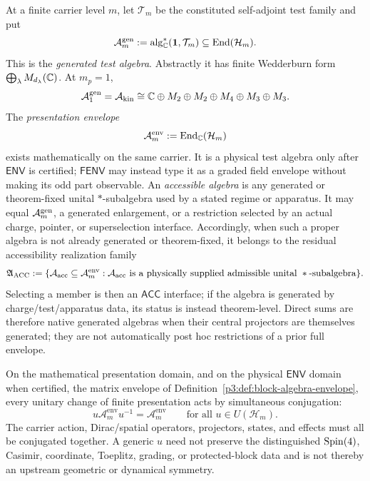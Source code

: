 \documentclass[12pt,a4paper]{article}
\begin{document}
\begin{definition}
\label{p4:def:resolved-vs-accessible-algebra}
At a finite carrier level \(m\), let \(\mathcal T_m\) be the constituted
self-adjoint test family and put
\[
 \mathcal A_m^{\rm gen}
 :=\operatorname{alg}_{\mathbb{C}}^{*}(\mathbf1,\mathcal T_m)
 \subseteq\operatorname{End}(\mathcal H_m).
\]
This is the \emph{generated test algebra}.  Abstractly it has finite
Wedderburn form \(\bigoplus_\lambda M_{d_\lambda}(\mathbb{C})\).  At \(m_p=1\),
\[
 \mathcal A_1^{\rm gen}=\mathcal A_{\rm kin}
 \cong\mathbb{C}\oplus M_2\oplus M_2\oplus M_4\oplus M_3\oplus M_3.
\]
The \emph{presentation envelope}
\[
 \mathcal A_m^{\rm env}:=\operatorname{End}_{\mathbb{C}}(\mathcal H_m)
\]
exists mathematically on the same carrier.  It is a physical test algebra only
after \(\mathsf{ENV}\) is certified; \(\mathsf{FENV}\) may instead type it as
a graded field envelope without making its odd part observable.  An
\emph{accessible algebra} is any
generated or theorem-fixed unital \(*\)-subalgebra used by a stated regime or
apparatus.  It may equal \(\mathcal A_m^{\rm gen}\), a generated enlargement,
or a restriction selected by an actual charge, pointer, or superselection
interface.  Accordingly, when such a proper algebra is not already generated
or theorem-fixed, it belongs to the residual accessibility realization family
\[
 \mathfrak A_{\rm ACC}
 :=\{\mathcal A_{\rm acc}\subseteq\mathcal A_m^{\rm env}:
 \mathcal A_{\rm acc}\text{ is a physically supplied admissible unital
 }*\text{-subalgebra}\}.
\]
Selecting a member is then an \(\mathsf{ACC}\) interface; if the algebra is
generated by charge/test/apparatus data, its status is instead theorem-level.
Direct sums are therefore native generated algebras when their
central projectors are themselves generated; they are not automatically
post hoc restrictions of a prior full envelope.
\end{definition}


\begin{lemma}
\label{p4:lem:unitary-naturality-resolved-events}
On the mathematical presentation domain, and on the physical
\(\mathsf{ENV}\) domain when certified, the matrix envelope of
Definition~\ref{p3:def:block-algebra-envelope}, every unitary change of
finite presentation acts by simultaneous conjugation:
\[
u\mathcal A_m^{\mathrm{env}} u^{-1}=\mathcal A_m^{\mathrm{env}}
\qquad
\text{for all }u\in U(\mathcal H_m).
\]
The carrier action, Dirac/spatial operators, projectors, states, and effects
must all be conjugated together.  A generic \(u\) need not preserve the
distinguished \(\mathrm{Spin}(4)\), Casimir, coordinate, Toeplitz, grading, or
protected-block data and is not thereby an upstream geometric or dynamical
symmetry.
\end{lemma}
\end{document}
